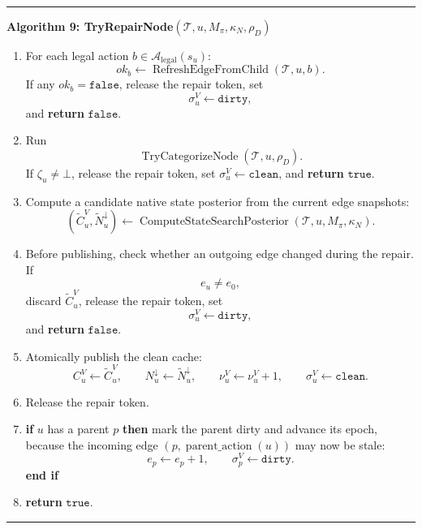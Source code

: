 \documentclass[11pt]{article}
\newcommand{\Tree}{\mathcal{T}}
\newcommand{\Legal}{\mathcal{A}_{\mathrm{legal}}}
\newcommand{\ComputeStateSearchPosterior}{\operatorname{ComputeStateSearchPosterior}}
\newcommand{\RefreshEdgeFromChild}{\operatorname{RefreshEdgeFromChild}}
\newcommand{\TryCategorizeNode}{\operatorname{TryCategorizeNode}}
\newenvironment{algorithmblock}[1]
{
  \par\medskip
  \noindent\hrule\par\smallskip
  \noindent\textbf{#1}
  \par\smallskip
}
{
  \par\smallskip\noindent\hrule\par\medskip
}
\newcommand{\Return}{\textbf{return }}
\newcommand{\If}{\textbf{if }}
\newcommand{\Then}{\textbf{ then }}
\newcommand{\EndIf}{\textbf{end if}}
\begin{document}
\begin{algorithmblock}{Algorithm 9: TryRepairNode\((\Tree,u,M_\pi,\kappa_N,\rho_D)\)}
\begin{enumerate}[leftmargin=2em]
  \item For each legal action \(b\in\Legal(s_u)\):
  \[
  ok_b\gets\RefreshEdgeFromChild(\Tree,u,b).
  \]
  If any \(ok_b=\texttt{false}\), release the repair token, set
  \[
  \sigma^V_u\gets\texttt{dirty},
  \]
  and \Return \(\texttt{false}\).

  \item Run
  \[
  \TryCategorizeNode(\Tree,u,\rho_D).
  \]
  If \(\zeta_u\ne\bot\), release the repair token, set
  \(\sigma^V_u\gets\texttt{clean}\), and \Return \(\texttt{true}\).

  \item Compute a candidate native state posterior from the current edge snapshots:
  \[
  (\tilde C^V_u,\tilde N^\downarrow_u)
  \gets
  \ComputeStateSearchPosterior(\Tree,u,M_\pi,\kappa_N).
  \]

  \item Before publishing, check whether an outgoing edge changed during the
  repair. If
  \[
  e_u\ne e_0,
  \]
  discard \(\tilde C^V_u\), release the repair token, set
  \[
  \sigma^V_u\gets\texttt{dirty},
  \]
  and \Return \(\texttt{false}\).

  \item Atomically publish the clean cache:
  \[
  C^V_u\gets\tilde C^V_u,
  \qquad
  N^\downarrow_u\gets\tilde N^\downarrow_u,
  \qquad
  \nu^V_u\gets\nu^V_u+1,
  \qquad
  \sigma^V_u\gets\texttt{clean}.
  \]

  \item Release the repair token.

  \item \If \(u\) has a parent \(p\) \Then mark the parent dirty and advance its
  epoch, because the incoming edge \((p,\operatorname{parent\_action}(u))\) may
  now be stale:
  \[
  e_p\gets e_p+1,
  \qquad
  \sigma^V_p\gets\texttt{dirty}.
  \]
  \EndIf

  \item \Return \(\texttt{true}\).
\end{enumerate}

\end{algorithmblock}
\end{document}

